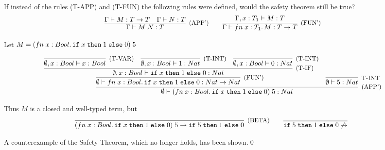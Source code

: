 \subsection{}

If instead of the rules (T-APP) and (T-FUN) the following rules were defined,
would the safety theorem still be true?
\[
	\infer[\text{\small{(APP')}}]
	{\Gamma \vdash \APP{M}{N}: T}
	{
		\Gamma \vdash M: T \to T &
		\Gamma \vdash N: T
	}
	\qquad
	\infer[\text{\small{(FUN')}}]
	{\Gamma \vdash \FN{x: T_1}{M}: T \to T}
	{\Gamma, x: T_1 \vdash M: T}
\]

Let $M = (fn\;x:Bool.\,\texttt{if}\;x\;\texttt{then}\;1\;\texttt{else}\;0)\;5$

\[
	\infer[\text{\small{(APP')}}]
	{\emptyset \vdash \APP{(\FN{x:Bool}{\IF{x}{1}{0}})}{5}: Nat}
	{
		\infer[\text{\small{(FUN')}}]
		{ \emptyset \vdash \FN{x:Bool}{\IF{x}{1}{0}}: Nat \to Nat }
		{
			\infer[\text{\small{(T-IF)}}]
			{ \emptyset, x: Bool \vdash \IF{x}{1}{0}: Nat }
			{
				\infer[\text{\small{(T-VAR)}}]{ \emptyset, x: Bool \vdash x: Bool }{} &
				\infer[\text{\small{(T-INT)}}]{ \emptyset, x: Bool \vdash 1: Nat }{} &
				\infer[\text{\small{(T-INT)}}]{ \emptyset, x: Bool \vdash 0: Nat }{}
			}
		}
		&
		\infer[\text{\small{T-INT}}]{ \emptyset \vdash 5: Nat }{}
	}
\]

Thus $M$ is a closed and well-typed term, but
\[
	\infer[\text{\small{(BETA)}}]
	{\APP{(\FN{x:Bool}{\IF{x}{1}{0}})}{5} \to \IF{5}{1}{0}}{}
	\qquad
	\infer[]{\IF{5}{1}{0} \not\to}{}
\]

A counterexample of the Safety Theorem, which no longer holds, has been shown.\qed
